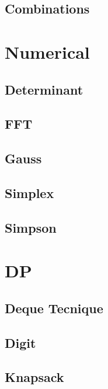\subsection{Combinations}
\raggedbottom
\hrulefill
\newpage

\section{Numerical}
\subsection{Determinant}
\raggedbottom
\hrulefill
\subsection{FFT}
\raggedbottom
\hrulefill
\subsection{Gauss}
\raggedbottom
\hrulefill
\subsection{Simplex}
\raggedbottom
\hrulefill
\subsection{Simpson}
\raggedbottom
\hrulefill
\newpage

\section{DP}
\subsection{Deque Tecnique}
\raggedbottom
\hrulefill
\subsection{Digit}
\raggedbottom
\hrulefill
\subsection{Knapsack}
\raggedbottom
\hrulefill
